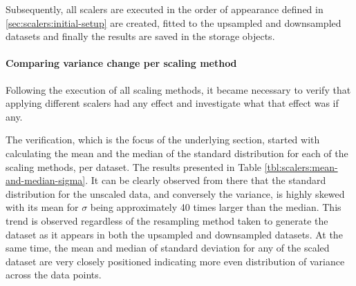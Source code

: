 Subsequently, all scalers are executed in the order of appearance defined in \ref{sec:scalers:initial-setup} are created, fitted to the upsampled and downsampled datasets and finally the results are saved in the storage objects.

\paragraph{Comparing variance change per scaling method}
Following the execution of all scaling methods, it became necessary to verify that applying different scalers had any effect and investigate what that effect was if any.

The verification, which is the focus of the underlying section, started with calculating the mean and the median of the standard distribution for each of the scaling methods, per dataset. The results presented in Table \ref{tbl:scalers:mean-and-median-sigma}. It can be clearly observed from there that the standard distribution for the unscaled data, and conversely the variance, is highly skewed with its mean for $\sigma$ being approximately 40 times larger than the median. This trend is observed regardless of the resampling method taken to generate the dataset as it appears in both the upsampled and downsampled datasets. At the same time, the mean and median of standard deviation for any of the scaled dataset are very closely positioned indicating more even distribution of variance across the data points.

